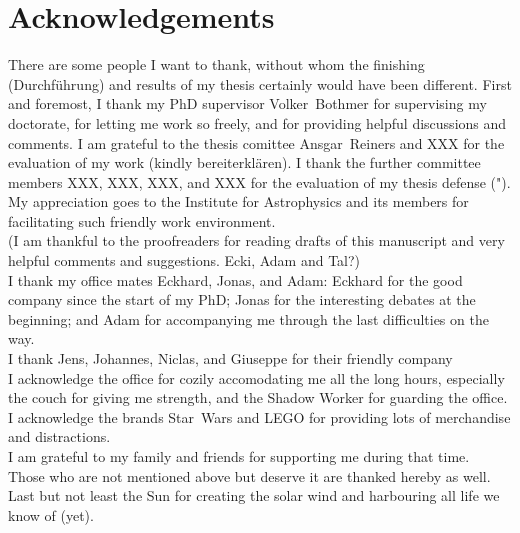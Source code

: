 
\chapter*{Acknowledgements}

There are some people I want to thank, without whom the finishing (Durchführung) and results of my thesis certainly would have been different.
First and foremost, I thank my PhD supervisor Volker~Bothmer for supervising my doctorate, for letting me work so freely, and for providing helpful discussions and comments.
I am grateful to the thesis comittee Ansgar~Reiners and XXX for the evaluation of my work (kindly bereiterklären).
I thank the further committee members XXX, XXX, XXX, and XXX for the evaluation of my thesis defense (").
My appreciation goes to the Institute for Astrophysics and its members for facilitating such friendly work environment.\\


(I am thankful to the proofreaders for reading drafts of this manuscript and very helpful comments and suggestions. Ecki, Adam and Tal?)\\


I thank my office mates Eckhard, Jonas, and Adam:
Eckhard for the good company since the start of my PhD;
Jonas for the interesting debates at the beginning;
and Adam for accompanying me through the last difficulties on the way.\\

I thank Jens, Johannes, Niclas, and Giuseppe for their friendly company\\

I acknowledge the office for cozily accomodating me all the long hours, especially the couch for giving me strength, and the Shadow Worker for guarding the office.\\

I acknowledge the brands Star~Wars and LEGO for providing lots of merchandise and distractions.\\

I am grateful to my family and friends for supporting me during that time.\\

Those who are not mentioned above but deserve it are thanked hereby as well.
Last but not least the Sun for creating the solar wind and harbouring all life we know of (yet).\\



